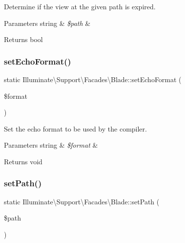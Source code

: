 Determine if the view at the given path is expired.


\begin{DoxyParams}[1]{Parameters}
string & {\em \$path} & \\
\hline
\end{DoxyParams}
\begin{DoxyReturn}{Returns}
bool 
\end{DoxyReturn}
\mbox{\label{class_illuminate_1_1_support_1_1_facades_1_1_blade_abe61a53debc94f487f169ba8f98cc1b7}} 
\subsubsection{\texorpdfstring{set\+Echo\+Format()}{setEchoFormat()}}
{\footnotesize\ttfamily static Illuminate\textbackslash{}\+Support\textbackslash{}\+Facades\textbackslash{}\+Blade\+::set\+Echo\+Format (\begin{DoxyParamCaption}\item[{}]{\$format }\end{DoxyParamCaption})\hspace{0.3cm}{\ttfamily [static]}}

Set the echo format to be used by the compiler.


\begin{DoxyParams}[1]{Parameters}
string & {\em \$format} & \\
\hline
\end{DoxyParams}
\begin{DoxyReturn}{Returns}
void 
\end{DoxyReturn}
\mbox{\label{class_illuminate_1_1_support_1_1_facades_1_1_blade_a09e64db7dab97caa40885f701d76057d}} 
\subsubsection{\texorpdfstring{set\+Path()}{setPath()}}
{\footnotesize\ttfamily static Illuminate\textbackslash{}\+Support\textbackslash{}\+Facades\textbackslash{}\+Blade\+::set\+Path (\begin{DoxyParamCaption}\item[{}]{\$path }\end{DoxyParamCaption})\hspace{0.3cm}{\ttfamily [static]}}

